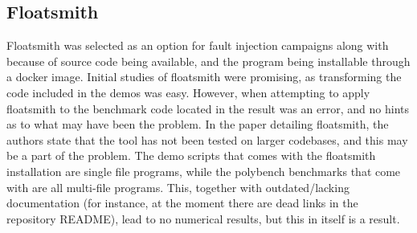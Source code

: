 \subsection{Floatsmith}

Floatsmith was selected as an option for fault injection campaigns along with \taffo{} because of source code being available, and the program being installable through a docker image. Initial studies of floatsmith were promising, as transforming the code included in the demos was easy. 
However, when attempting to apply floatsmith to the benchmark code located in \taffo{} the result was an error, and no hints as to what may have been the problem. In the paper detailing floatsmith, the authors state that the tool has not been tested on larger codebases, and this may be a part of the problem. The demo scripts that comes with the floatsmith installation are single file programs, while the polybench benchmarks that come with \taffo{} are all multi-file programs. This, together with outdated/lacking documentation (for instance, at the moment there are dead links in the repository README), lead to no numerical results, but this in itself is a result.


